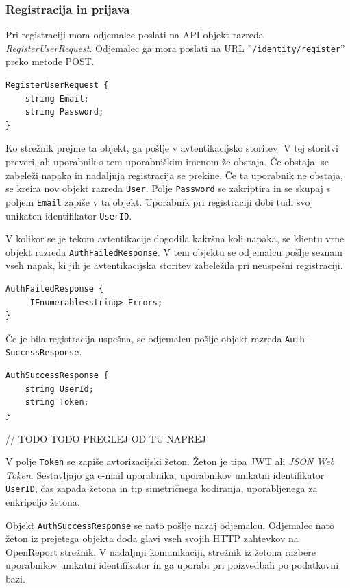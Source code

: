 \documentclass[a4paper, 12pt]{book}
\begin{document}
\subsubsection{Registracija in prijava}

Pri registraciji mora odjemalec poslati na API objekt razreda \textit{RegisterUserRequest}.
Odjemalec ga mora poslati na URL ''\texttt{/identity/register}'' preko metode POST.

\begin{verbatim}
RegisterUserRequest {
    string Email; 
    string Password; 
} 
\end{verbatim}


Ko strežnik prejme ta objekt, ga pošlje v avtentikacijsko storitev.
V tej storitvi preveri, ali uporabnik s tem uporabniškim imenom že obstaja.
Če obstaja, se zabeleži napaka in nadaljnja registracija se prekine.
Če ta uporabnik ne obstaja, se kreira nov objekt razreda \texttt{User}.
Polje \texttt{Password} se zakriptira in se skupaj s poljem \texttt{Email} zapiše v ta objekt.
Uporabnik pri registraciji dobi tudi svoj unikaten identifikator \texttt{UserID}.

V kolikor se je tekom avtentikacije dogodila kakršna koli napaka, se klientu vrne objekt razreda \texttt{AuthFailedResponse}.
V tem objektu se odjemalcu pošlje seznam vseh napak, ki jih je avtentikacijska storitev zabeležila pri neuspešni registraciji. 

\begin{verbatim}
AuthFailedResponse { 
     IEnumerable<string> Errors; 
}
\end{verbatim}


Če je bila registracija uspešna, se odjemalcu pošlje objekt razreda \texttt{Auth-\\SuccessResponse}.

\begin{verbatim}
AuthSuccessResponse { 
    string UserId; 
    string Token; 
} 
\end{verbatim}


// TODO TODO PREGLEJ OD TU NAPREJ

\noindent V polje \texttt{Token} se zapiše avtorizacijski žeton.
Žeton je tipa JWT ali \textit{JSON Web Token}.
Sestavljajo ga e-mail uporabnika, uporabnikov unikatni identifikator \texttt{UserID}, čas zapada žetona in tip simetričnega kodiranja, uporabljenega za enkripcijo žetona.

Objekt \texttt{AuthSuccessResponse} se nato pošlje nazaj odjemalcu.
Odjemalec nato žeton iz prejetega objekta doda glavi vseh svojih HTTP zahtevkov na OpenReport strežnik.
V nadaljnji komunikaciji, strežnik iz žetona razbere uporabnikov unikatni identifikator in ga uporabi pri poizvedbah po podatkovni bazi.
\end{document}
